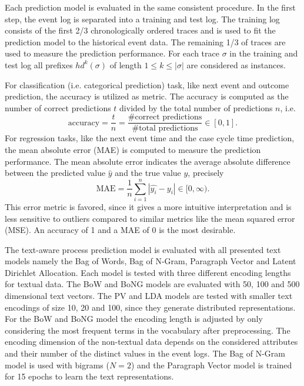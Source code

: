 Each prediction model is evaluated in the same consistent procedure.
In the first step, the event log is separated into a training and test log. 
The training log consists of the first 2/3 chronologically ordered traces and is used to fit the prediction model to the historical event data.
The remaining 1/3 of traces are used to measure the prediction performance.
For each trace $\sigma$ in the training and test log all prefixes $hd^k(\sigma)$ of length $1 \leq k \leq |\sigma|$ are considered as instances.

For classification (i.e. categorical prediction) task, like next event and outcome prediction, the accuracy is utilized as metric.
The accuracy is computed as the number of correct predictions $t$ divided by the total number of predictions $n$, i.e. 
\begin{equation*}
	\textrm{accuracy} = \dfrac{t}{n} = \dfrac{\textrm{\# correct predictions}}{\textrm{\# total predictions}} \in [0,1].
\end{equation*}
For regression tasks, like the next event time and the case cycle time prediction, the mean absolute error (MAE) is computed to measure the prediction performance. The mean absolute error indicates the average absolute difference between the predicted value $\hat{y}$ and the true value $y$,  precisely
\begin{equation*}
	\textrm{MAE} = \dfrac{1}{n}\sum_{i=1}^{n}|\hat{y_i} - y_i| \in [0, \infty).
\end{equation*}
This error metric is favored, since it gives a more intuitive interpretation and is less sensitive to outliers compared to similar metrics like the mean squared error (MSE).
An accuracy of 1 and a MAE of 0 is the most desirable.

The text-aware process prediction model is evaluated with all presented text models namely the Bag of Words, Bag of N-Gram, Paragraph Vector and Latent Dirichlet Allocation.
Each model is tested with three different encoding lengths for textual data.
The BoW and BoNG models are evaluated with 50, 100 and 500 dimensional text vectors.
The PV and LDA models are tested with smaller text encodings of size 10, 20 and 100, since they generate distributed representations.
For the BoW and BoNG model the encoding length is adjusted by only considering the most frequent terms in the vocabulary after preprocessing.
The encoding dimension of the non-textual data depends on the considered attributes and their number of the distinct values in the event logs.
The Bag of N-Gram model is used with bigrams ($N = 2$) and the Paragraph Vector model is trained for 15 epochs to learn the text representations.

